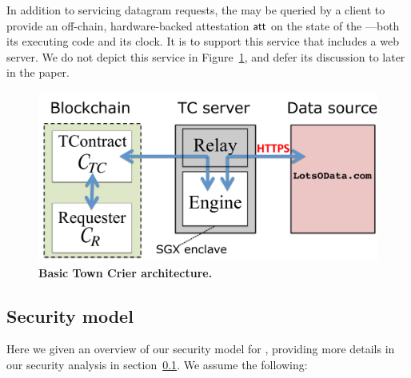 In addition to servicing datagram requests, the \encname may be queried by a client to provide an off-chain, hardware-backed attestation ${\sf att}$ on the state of the \encname---both its executing code and its clock. It is to support this service that \medname includes a web server. We do not depict this service in Figure~\ref{fig:overview}, and defer its discussion to later in the paper.

\vspace{-2mm}
\begin{figure}[h!]
\centering
\includegraphics[width=\columnwidth]{OverviewFig}
\caption{{\bf Basic Town Crier architecture.}}
\label{fig:overview}
\end{figure}
\vspace{-2mm}



\subsection{Security model}

Here we given an overview of our security model for \tc, providing more details in our security analysis in section~\ref{}. We assume the following:

